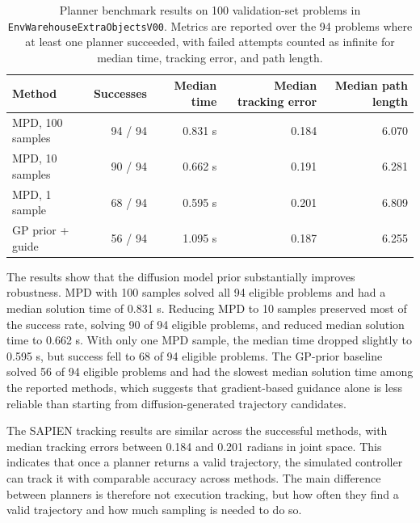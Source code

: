 \documentclass[11pt]{article}
\begin{document}
\begin{table}[htbp]
    \centering
    \begin{tabular}{l r r r r}
        \hline
        Method & Successes & Median time & Median tracking error & Median path length \\
        \hline
        MPD, 100 samples & 94 / 94 & 0.831 s & 0.184 & 6.070 \\
        MPD, 10 samples & 90 / 94 & 0.662 s & 0.191 & 6.281 \\
        MPD, 1 sample & 68 / 94 & 0.595 s & 0.201 & 6.809 \\
        GP prior + guide & 56 / 94 & 1.095 s & 0.187 & 6.255 \\
        \hline
    \end{tabular}
    \caption{Planner benchmark results on 100 validation-set problems in \texttt{EnvWarehouseExtraObjectsV00}. Metrics are reported over the 94 problems where at least one planner succeeded, with failed attempts counted as infinite for median time, tracking error, and path length.}
    \label{tab:planner-benchmark}
\end{table}

The results show that the diffusion model prior substantially improves robustness. MPD with 100 samples solved all 94 eligible problems and had a median solution time of 0.831 s. Reducing MPD to 10 samples preserved most of the success rate, solving 90 of 94 eligible problems, and reduced median solution time to 0.662 s. With only one MPD sample, the median time dropped slightly to 0.595 s, but success fell to 68 of 94 eligible problems. The GP-prior baseline solved 56 of 94 eligible problems and had the slowest median solution time among the reported methods, which suggests that gradient-based guidance alone is less reliable than starting from diffusion-generated trajectory candidates.

The SAPIEN tracking results are similar across the successful methods, with median tracking errors between 0.184 and 0.201 radians in joint space. This indicates that once a planner returns a valid trajectory, the simulated controller can track it with comparable accuracy across methods. The main difference between planners is therefore not execution tracking, but how often they find a valid trajectory and how much sampling is needed to do so.
\end{document}
